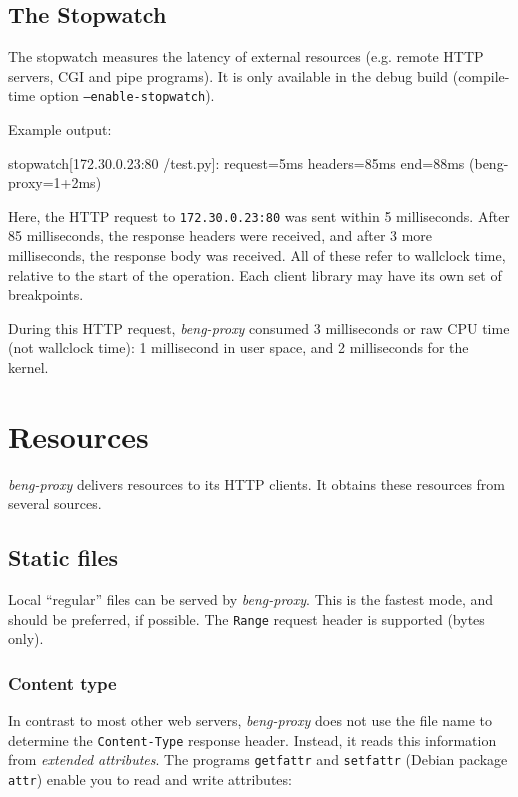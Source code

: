 \documentclass[a4paper,12pt]{article}
\begin{document}
\subsection{The Stopwatch}
\label{stopwatch}

The stopwatch measures the latency of external resources (e.g. remote
HTTP servers, CGI and pipe programs).  It is only available in the
debug build (compile-time option \texttt{--enable-stopwatch}).

Example output:

\begin{verbatim*}
stopwatch[172.30.0.23:80 /test.py]: request=5ms headers=85ms
end=88ms (beng-proxy=1+2ms)
\end{verbatim*}

Here, the HTTP request to \texttt{172.30.0.23:80} was sent within 5
milliseconds.  After 85 milliseconds, the response headers were
received, and after 3 more milliseconds, the response body was
received.  All of these refer to wallclock time, relative to the start
of the operation.  Each client library may have its own set of
breakpoints.

During this HTTP request, \emph{beng-proxy} consumed 3 milliseconds or
raw CPU time (not wallclock time): 1 millisecond in user space, and 2
milliseconds for the kernel.

\section{Resources}

\emph{beng-proxy} delivers resources to its HTTP clients.  It obtains
these resources from several sources.

\subsection{Static files}
\label{static}

Local ``regular'' files can be served by \emph{beng-proxy}.  This is
the fastest mode, and should be preferred, if possible.  The
\texttt{Range} request header is supported (bytes only).

\subsubsection{Content type}

\label{xattr}

In contrast to most other web servers, \emph{beng-proxy} does not use
the file name to determine the \texttt{Content-Type} response header.
Instead, it reads this information from \textit{extended attributes}.
The programs \texttt{getfattr} and \texttt{setfattr} (Debian package
\texttt{attr}) enable you to read and write attributes:
\end{document}
